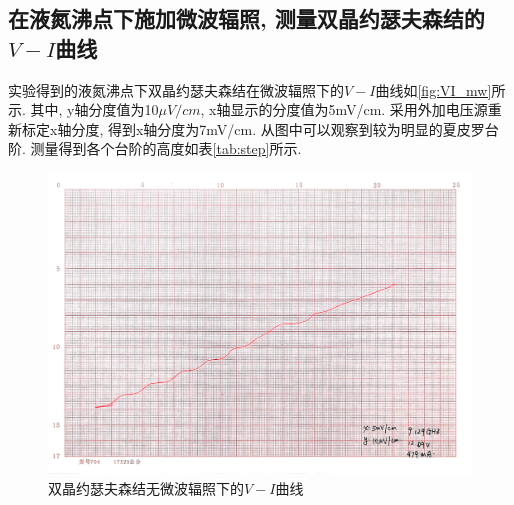 \documentclass[font=default]{mpltx}
\begin{document}
  \subsection{在液氮沸点下施加微波辐照, 测量双晶约瑟夫森结的$V-I$曲线}
  实验得到的液氮沸点下双晶约瑟夫森结在微波辐照下的$V-I$曲线如\autoref{fig:VI_mw}所示. 其中, y轴分度值为10$\mu V/cm$, x轴显示的分度值为5mV/cm.
  采用外加电压源重新标定x轴分度, 得到x轴分度为7mV/cm.
  从图中可以观察到较为明显的夏皮罗台阶.
  测量得到各个台阶的高度如表\ref{tab:step}所示.
  \begin{figure}[htbp]
      \centering
      \includegraphics[width=0.85\linewidth]{fig/5.jpg}
      \caption{双晶约瑟夫森结无微波辐照下的$V-I$曲线}
      \label{fig:VI_mw}
    \end{figure}
  
\end{document}

